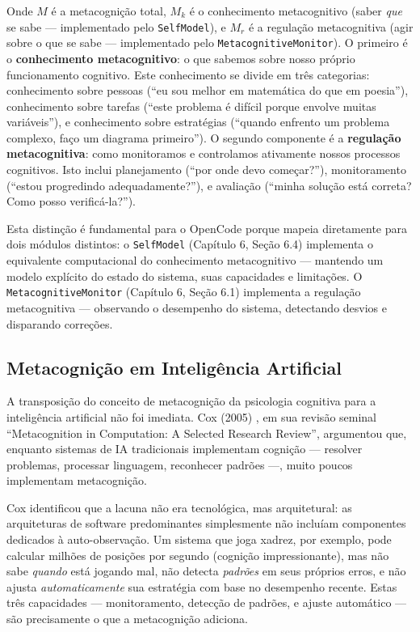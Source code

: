 Onde $M$ é a metacognição total, $M_k$ é o conhecimento metacognitivo (saber \textit{que} se sabe — implementado pelo \texttt{SelfModel}), e $M_r$ é a regulação metacognitiva (agir sobre o que se sabe — implementado pelo \texttt{MetacognitiveMonitor}). O primeiro é o \textbf{conhecimento metacognitivo}: o que sabemos sobre nosso próprio funcionamento cognitivo. Este conhecimento se divide em três categorias: conhecimento sobre pessoas (``eu sou melhor em matemática do que em poesia''), conhecimento sobre tarefas (``este problema é difícil porque envolve muitas variáveis''), e conhecimento sobre estratégias (``quando enfrento um problema complexo, faço um diagrama primeiro''). O segundo componente é a \textbf{regulação metacognitiva}: como monitoramos e controlamos ativamente nossos processos cognitivos. Isto inclui planejamento (``por onde devo começar?''), monitoramento (``estou progredindo adequadamente?''), e avaliação (``minha solução está correta? Como posso verificá-la?'').

Esta distinção é fundamental para o OpenCode porque mapeia diretamente para dois módulos distintos: o \texttt{SelfModel} (Capítulo 6, Seção 6.4) implementa o equivalente computacional do conhecimento metacognitivo — mantendo um modelo explícito do estado do sistema, suas capacidades e limitações. O \texttt{MetacognitiveMonitor} (Capítulo 6, Seção 6.1) implementa a regulação metacognitiva — observando o desempenho do sistema, detectando desvios e disparando correções.

\subsection{Metacognição em Inteligência Artificial}

A transposição do conceito de metacognição da psicologia cognitiva para a inteligência artificial não foi imediata. Cox (2005) , em sua revisão seminal ``Metacognition in Computation: A Selected Research Review'', argumentou que, enquanto sistemas de IA tradicionais implementam cognição — resolver problemas, processar linguagem, reconhecer padrões —, muito poucos implementam metacognição.

Cox identificou que a lacuna não era tecnológica, mas arquitetural: as arquiteturas de software predominantes simplesmente não incluíam componentes dedicados à auto-observação. Um sistema que joga xadrez, por exemplo, pode calcular milhões de posições por segundo (cognição impressionante), mas não sabe \textit{quando} está jogando mal, não detecta \textit{padrões} em seus próprios erros, e não ajusta \textit{automaticamente} sua estratégia com base no desempenho recente. Estas três capacidades — monitoramento, detecção de padrões, e ajuste automático — são precisamente o que a metacognição adiciona.

